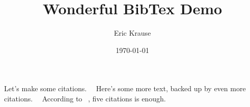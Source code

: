 \documentclass{article}
\begin{document}
\title{Wonderful BibTex Demo}
\author{Eric Krause}
\date{\today}
\maketitle
Let's make some citations.~\cite{Nobody06}~\cite{Meyer2000}  Here's some more text, backed up by even more citations.~\cite{Codishetal2000}~\cite{Huetal2000}  According to ~\cite{Conway2000}, five citations is enough.



\end{document}
